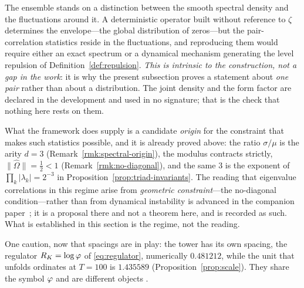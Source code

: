 \begin{remark}\label{rmk:envelope-not-fluctuations}
The ensemble stands on a distinction between the smooth spectral density and the fluctuations
around it. A deterministic operator built without reference to $\zeta$ determines the
envelope---the global distribution of zeros---but the pair-correlation statistics reside in the
fluctuations, and reproducing them would require either an exact spectrum or a dynamical mechanism
generating the level repulsion of Definition~\ref{def:repulsion}. \emph{This is intrinsic to the
construction, not a gap in the work}: it is why the present subsection proves a statement about
\emph{one pair} rather than about a distribution. The joint density and the form factor are
declared in the development and used in no signature; that is the check that nothing here rests on
them. \Empty
\end{remark}

\begin{remark}\label{rmk:geometric-origin}
What the framework does supply is a candidate \emph{origin} for the constraint that makes such
statistics possible, and it is already proved above: the ratio $\sigma/\mu$ is the arity $d=3$
(Remark~\ref{rmk:spectral-origin}), the modulus contracts strictly, $\|\hat\Omega\|=\tfrac12<1$
(Remark~\ref{rmk:no-diagonal}), and the same $3$ is the exponent of
$\prod_k\lvert\lambda_k\rvert=2^{-3}$ in Proposition~\ref{prop:triad-invariants}. The reading that
eigenvalue correlations in this regime arise from \emph{geometric constraint}---the no-diagonal
condition---rather than from dynamical instability is advanced in the companion paper~\cite{HP};
it is a proposal there and not a theorem here, and is recorded as such. What is established in
this section is the regime, not the reading. 
\end{remark}

\begin{remark}\label{rmk:not-the-tower-spacing}
One caution, now that spacings are in play: the tower has its own spacing, the regulator
$R_K=\log\varphi$ of \eqref{eq:regulator}, numerically $0.481212$, while the unit that unfolds
ordinates at $T=100$ is $1.435589$ (Proposition~\ref{prop:scale}). They share the symbol $\varphi$
and are different objects .
\end{remark}

